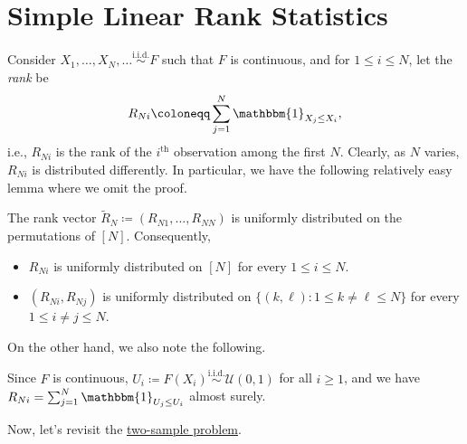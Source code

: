 \section{Simple Linear Rank Statistics}
Consider \(X_1, \dots , X_N, \dots \overset{\text{i.i.d.} }{\sim } F\) such that \(F\) is continuous, and for \(1 \leq i \leq N\), let the \emph{rank} be
\[
	R_{Ni}
	\coloneqq \sum_{j=1}^{N} \mathbbm{1}_{X_j \leq X_i},
\]
i.e., \(R_{Ni}\) is the rank of the \(i^{\text{th} }\) observation among the first \(N\). Clearly, as \(N\) varies, \(R_{Ni}\) is distributed differently. In particular, we have the following relatively easy lemma where we omit the proof.

\begin{lemma}\label{lma:rank}
	The rank vector \(\widetilde{R} _N \coloneqq (R_{N1}, \dots , R_{NN})\) is uniformly distributed on the permutations of \([N]\). Consequently,
	\begin{itemize}
		\item \(R_{Ni}\) is uniformly distributed on \([N]\) for every \(1 \leq i \leq N\).
		\item \((R_{Ni}, R_{Nj})\) is uniformly distributed on \(\{ (k, \ell) \colon 1 \leq k \neq \ell \leq N\} \) for every \(1 \leq i\neq j \leq N\).
	\end{itemize}
\end{lemma}

On the other hand, we also note the following.

\begin{remark}
	Since \(F\) is continuous, \(U_i \coloneqq F(X_i)\overset{\text{i.i.d.} }{\sim } \mathcal{U} (0, 1)\) for all \(i \geq 1\), and we have \(R_{Ni} = \sum_{j=1}^{N} \mathbbm{1}_{U_j \leq U_i} \) almost surely.
\end{remark}

Now, let's revisit the \hyperref[prb:two-sample]{two-sample problem}.

